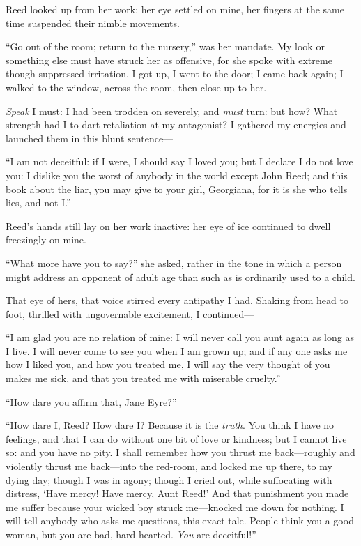 \Mrs{} Reed looked up from her work; her eye settled on mine, her fingers
at the same time suspended their nimble movements.

\enquote{Go out of the room; return to the nursery,} was her mandate.
My look or something else must have struck her as offensive, for she
spoke with extreme though suppressed irritation. I got up, I went to
the door; I came back again; I walked to the window, across the room,
then close up to her.

\emph{Speak} I must: I had been trodden on severely, and \emph{must}
turn: but how? What strength had I to dart retaliation at my
antagonist? I gathered my energies and launched them in this blunt
sentence---

\enquote{I am not deceitful: if I were, I should say I loved you; but I
	declare I do not love you: I dislike you the worst of anybody in the
	world except John Reed; and this book about the liar, you may give to
	your girl, Georgiana, for it is she who tells lies, and not I\@.}

\Mrs{} Reed's hands still lay on her work inactive: her eye of ice
continued to dwell freezingly on mine.

\enquote{What more have you to say?} she asked, rather in the tone in
which a person might address an opponent of adult age than such as is
ordinarily used to a child.

That eye of hers, that voice stirred every antipathy I had. Shaking
from head to foot, thrilled with ungovernable excitement, I continued---

\enquote{I am glad you are no relation of mine: I will never call you
	aunt again as long as I live. I will never come to see you when I am
	grown up; and if any one asks me how I liked you, and how you treated
	me, I will say the very thought of you makes me sick, and that you
	treated me with miserable cruelty.}

\enquote{How dare you affirm that, Jane Eyre?}

\enquote{How dare I, \Mrs{} Reed? How dare I? Because it is the \emph{truth}.
	You think I have no feelings, and that I can do without one bit of love
	or kindness; but I cannot live so: and you have no pity. I shall
	remember how you thrust me back---roughly and violently thrust me
	back---into the red-room, and locked me up there, to my dying day;
	though I was in agony; though I cried out, while suffocating with
	distress, \enquote{Have mercy! Have mercy, Aunt Reed!} And that
	punishment you made me suffer because your wicked boy struck
	me---knocked me down for nothing. I will tell anybody who asks me
	questions, this exact tale. People think you a good woman, but you are
	bad, hard-hearted. \emph{You} are deceitful!}


